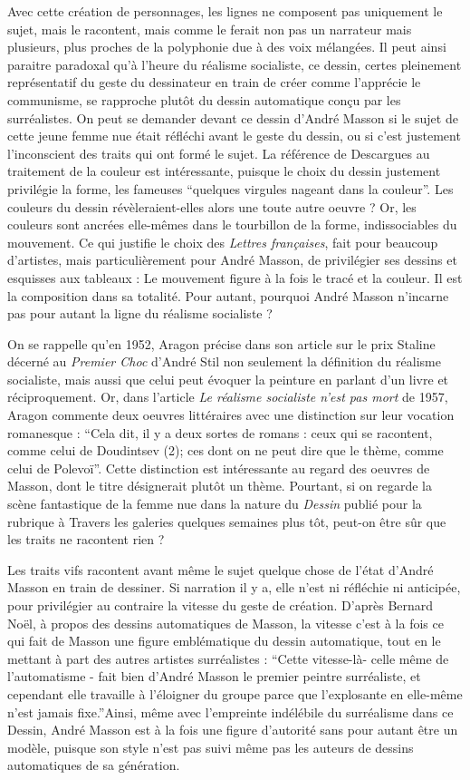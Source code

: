 	Avec cette création de personnages, les lignes ne composent pas uniquement le sujet, mais le racontent, mais comme le ferait non pas un narrateur mais plusieurs, plus proches de la polyphonie due à des voix mélangées. Il peut ainsi paraitre paradoxal qu’à l’heure du réalisme socialiste, ce dessin, certes pleinement représentatif du geste du dessinateur en train de créer comme l’apprécie le communisme, se rapproche plutôt du dessin automatique conçu par les surréalistes. On peut se demander devant ce dessin d’André Masson si le sujet de cette jeune femme nue était réfléchi avant le geste du dessin, ou si c’est justement l’inconscient des traits qui ont formé le sujet. La référence de Descargues au traitement de la couleur est intéressante, puisque le choix du dessin justement privilégie la forme, les fameuses \enquote{quelques virgules nageant dans la couleur}. Les couleurs du dessin révèleraient-elles alors une toute autre oeuvre ? Or, les couleurs sont ancrées elle-mêmes dans le tourbillon de la forme, indissociables du mouvement. Ce qui justifie le choix des \emph{Lettres françaises}, fait pour beaucoup d’artistes, mais particulièrement pour André Masson, de privilégier ses dessins et esquisses aux tableaux : Le mouvement figure à la fois le tracé et la couleur. Il est la composition dans sa totalité. Pour autant, pourquoi André Masson n’incarne pas pour autant la ligne du réalisme socialiste ? 


On se rappelle qu’en 1952, Aragon précise dans son article sur le prix Staline décerné au \emph{Premier Choc} d’André Stil non seulement la définition du réalisme socialiste, mais aussi que celui peut évoquer la peinture en parlant d’un livre et réciproquement. Or, dans l’article \emph{Le réalisme socialiste n’est pas mort} de 1957, Aragon commente deux oeuvres littéraires avec une distinction sur leur vocation romanesque : \enquote{Cela dit, il y a deux sortes de romans : ceux qui se racontent, comme celui de Doudintsev (2); ces dont on ne peut dire que le thème, comme celui de Polevoï}. Cette distinction est intéressante au regard des oeuvres de Masson, dont le titre désignerait plutôt un thème. Pourtant, si on regarde la scène fantastique de la femme nue dans la nature du \emph{Dessin }publié pour la rubrique à Travers les galeries quelques semaines plus tôt, peut-on être sûr que les traits ne racontent rien ? 

	Les traits vifs racontent avant même le sujet quelque chose de l’état d’André Masson en train de dessiner. Si narration il y a, elle n’est ni réfléchie ni anticipée, pour privilégier au contraire la vitesse du geste de création. D’après Bernard Noël, à propos des dessins automatiques de Masson, la vitesse c’est à la fois ce qui fait de Masson une figure emblématique du dessin automatique, tout en le mettant à part des autres artistes surréalistes : \enquote{Cette vitesse-là- celle même de l’automatisme - fait bien d’André Masson le premier peintre surréaliste, et cependant elle travaille à l’éloigner du groupe parce que l’explosante en elle-même n’est jamais fixe.}Ainsi, même avec l’empreinte indélébile du surréalisme dans ce Dessin, André Masson est à la fois une figure d’autorité sans pour autant être un modèle, puisque son style n’est pas suivi même pas les auteurs de dessins automatiques de sa génération. 

